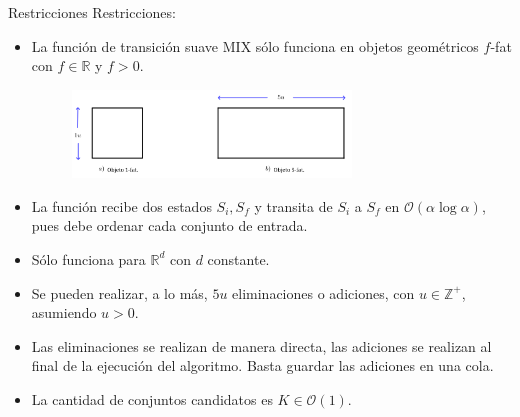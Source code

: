 \begin{frame}{Restricciones}
  Restricciones:
  \begin{itemize}[<+->]
  \item La función de transición suave MIX sólo funciona en objetos
    geométricos $f$-fat con $f \in \mathbb{R}$ y $f>0$.
    \begin{figure}  
      \centering
      \includegraphics[width=0.7\textwidth]{./Images/fat.png}
    \end{figure}
  \item La función recibe dos estados $S_i, S_f$ y transita de $S_i$
    a $S_f$ en $\mathcal{O}(\alpha \log \alpha)$, pues debe ordenar
    cada conjunto de entrada.
  \item Sólo funciona para $\mathbb{R}^d$ con $d$ constante.
  \item Se pueden realizar, a lo más, $5u$ eliminaciones o adiciones,
    con $u \in \mathbb{Z}^+$, asumiendo $u > 0$.
  \item Las eliminaciones se realizan de manera directa, las adiciones
    se realizan al final de la ejecución del algoritmo. Basta guardar
    las adiciones en una cola.
  \item La cantidad de conjuntos candidatos es $K \in \mathcal{O}(1)$.
  \end{itemize}
\end{frame}
